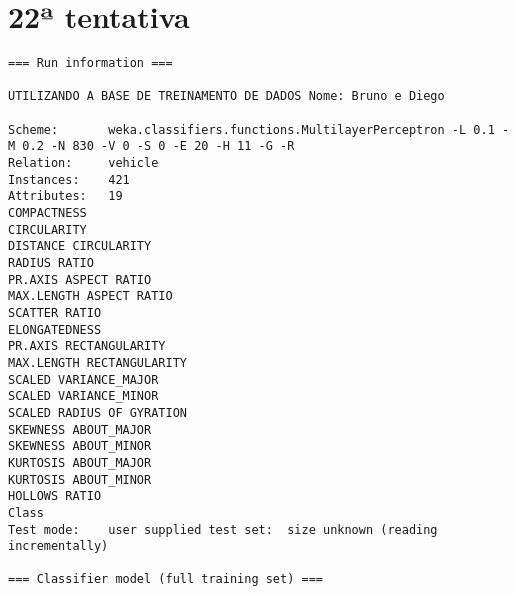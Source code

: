 \documentclass[
	article,			%
	11pt,				%
	oneside,			%
	a4paper,			%
	english,			%
	brazil,				%
	sumario=tradicional
	]{abntex2}
\begin{document}
\section{22ª tentativa}

\begin{lstlisting}
=== Run information ===

UTILIZANDO A BASE DE TREINAMENTO DE DADOS Nome: Bruno e Diego

Scheme:       weka.classifiers.functions.MultilayerPerceptron -L 0.1 -M 0.2 -N 830 -V 0 -S 0 -E 20 -H 11 -G -R
Relation:     vehicle
Instances:    421
Attributes:   19
COMPACTNESS
CIRCULARITY
DISTANCE CIRCULARITY
RADIUS RATIO
PR.AXIS ASPECT RATIO
MAX.LENGTH ASPECT RATIO
SCATTER RATIO
ELONGATEDNESS
PR.AXIS RECTANGULARITY
MAX.LENGTH RECTANGULARITY
SCALED VARIANCE_MAJOR
SCALED VARIANCE_MINOR
SCALED RADIUS OF GYRATION
SKEWNESS ABOUT_MAJOR
SKEWNESS ABOUT_MINOR
KURTOSIS ABOUT_MAJOR
KURTOSIS ABOUT_MINOR
HOLLOWS RATIO
Class
Test mode:    user supplied test set:  size unknown (reading incrementally)

=== Classifier model (full training set) ===


\end{lstlisting}
\end{document}
